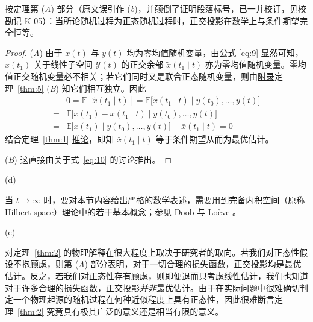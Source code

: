 按\hyperref[thm:2]{定理}第 (\emph{A}) 部分（原文误引作 (\emph{b})，并颠倒了证明段落标号，已一并校订，见\hyperref[sec:k05]{校勘记 K-05}）：当所论随机过程为正态随机过程时，正交投影在数学上与条件期望完全恒等。

\begin{proof}

(\emph{A}) 由于 $x(t)$ 与 $y(t)$ 均为零均值随机变量，由公式 \eqref{eq:9} 显然可知，$x(t_1)$ 关于线性子空间 $\mathcal{Y}(t)$ 的正交余部 $\tilde{x}(t_1 \mid t)$ 亦为零均值随机变量。零均值正交随机变量必不相关；若它们同时又是联合正态随机变量，则由\hyperref[sec:appendix]{附录}定理~\ref{thm:5} (\emph{B}) 知它们相互独立。因此
\begin{equation*}
\begin{aligned}
&0 = \mathbb{E}[\tilde{x}(t_1 \mid t)] = \mathbb{E}\bigl[\tilde{x}(t_1 \mid t) \mid y(t_0), \dots, y(t)\bigr] \\
= &\mathbb{E}\bigl[x(t_1) - \bar{x}(t_1 \mid t) \mid y(t_0), \dots, y(t)\bigr] \\
= &\mathbb{E}\bigl[x(t_1) \mid y(t_0), \dots, y(t)\bigr] - \bar{x}(t_1 \mid t) = 0
\end{aligned}
\end{equation*}
结合定理~\ref{thm:1} \hyperref[cor:1]{推论}，即知 $\bar{x}(t_1 \mid t)$ 等于条件期望从而为最优估计。

(\emph{B}) 这直接由关于式~\eqref{eq:10} 的讨论推出。

\end{proof}

\begin{remarkn}{(d)}\label{rem:d}

当 $t \to \infty$ 时，要对本节内容给出严格的数学表述，需要用到完备内积空间（原称 Hilbert space）理论中的若干基本概念；参见 Doob \cite{r15} 与 Loève \cite{r16}。

\end{remarkn}

\begin{remarkn}{(e)}\label{rem:e}

对定理~\ref{thm:2} 的物理解释在很大程度上取决于研究者的取向。若我们对正态性假设不抱顾虑，则第 (\emph{A}) 部分表明，对于一切合理的损失函数，正交投影均是最优估计。反之，若我们对正态性存有顾虑，则即便退而只考虑线性估计，我们也知道对于许多合理的损失函数，正交投影\emph{并非}最优估计。由于在实际问题中很难确切判定一个物理起源的随机过程在何种近似程度上具有正态性，因此很难断言定理~\ref{thm:2} 究竟具有极其广泛的意义还是相当有限的意义。

\end{remarkn}

